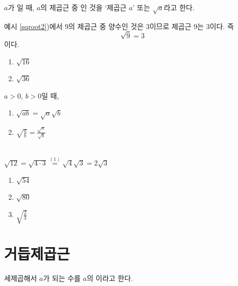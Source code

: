 \documentclass{oblivoir}
\begin{document}
\newpage
%
\begin{mdframed}
\label{sqroot5}
\(a\)가 일 때, \(a\)의 제곱근 중 인 것을 `제곱근 \(a\)' 또는 \(\sqrt a\)라고 한다.
\end{mdframed}

%
\exam{}\label{sqroot6}
예시 \ref{sqroot2})에서 9의 제곱근 중 양수인 것은 \(3\)이므로 제곱근 9는 3이다.
즉
\[\sqrt9=3\]
이다.


%
\begin{enumerate}\label{sqroot7}
\item
\(\sqrt{16}\)
\item
\(\sqrt{36}\)
\end{enumerate}

%
\begin{mdframed}
\label{sqroot8}
\(a>0\), \(b>0\)일 때,
\begin{enumerate}
\item
\(\sqrt{ab}=\sqrt a\sqrt b\)
\item
\(\sqrt{\frac ab}=\frac{\sqrt a}{\sqrt b}\)
\end{enumerate}
\end{mdframed}

%
\label{sqroot9}
\\
\(\sqrt{12}=\sqrt{4\cdot3}\stackrel{(1)}=\sqrt4\sqrt3=2\sqrt3\)

%
\begin{enumerate}\label{sqroot10}
\item
\(\sqrt{54}\)
\item
\(\sqrt{80}\)
\item
\(\sqrt{\frac23}\)
\end{enumerate}

\section{거듭제곱근}
%
\begin{mdframed}
\label{nthroot1}
세제곱해서 \(a\)가 되는 수를 \(a\)의 이라고 한다.
\end{mdframed}
\end{document}
